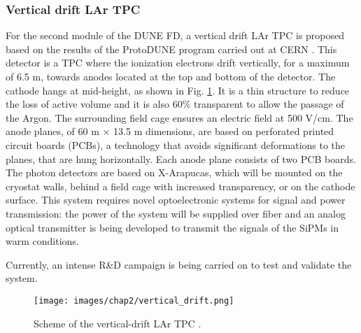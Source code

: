 \subsubsection{Vertical drift LAr TPC}
For the second module of the DUNE FD, a vertical drift LAr TPC is proposed based on the results of the ProtoDUNE program carried out at CERN \cite{vertical_drift}. This detector is a TPC where the ionization electrons drift vertically, for a maximum of 6.5 m, towards anodes located at the top and bottom of the detector. The cathode hangs at mid-height, as shown in Fig. \ref{fig:vertical-drift}. It is a thin structure to reduce the loss of active volume and it is also 60\% transparent to allow the passage of the Argon. The surrounding field cage ensures an electric field at 500 V/cm.
The anode planes, of 60 m $\times$ 13.5 m dimensions, are based on perforated printed circuit boards (PCBs), a technology that avoids significant deformations to the planes, that are hung horizontally. Each anode plane consists of two PCB boards.\\
The photon detectors are based on X-Arapucas, which will be mounted 
on the cryostat walls, behind a field cage with increased transparency, or on the cathode surface. This system requires novel optoelectronic systems for signal and power transmission: the power of the system will be supplied over fiber and an analog optical transmitter is being developed to transmit the signals of the SiPMs in warm conditions.

Currently, an intense R\&D campaign is being carried on to test and validate the system. 

\begin{figure}
    \centering
    \texttt{[image: images/chap2/vertical\_drift.png]}
    \caption{Scheme of the vertical-drift LAr TPC \cite{vertical_drift}.}
    \label{fig:vertical-drift}
\end{figure}

